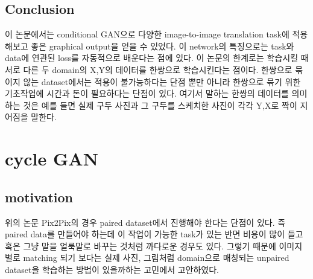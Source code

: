 \documentclass[extendedabs]{bmvc2k}
\begin{document}
 \subsection{Conclusion}
 \quad 이 논문에서는 conditional GAN으로 다양한 image-to-image translation task에 적용해보고 좋은 graphical output을 얻을 수 있었다.
 이 network의 특징으로는 task와 data에 연관된 loss를 자동적으로 배운다는 점에 있다. 이 논문의 한계로는 학습시킬 때 서로 다른 두 domain의 X,Y의 데이터를 한쌍으로 학습시킨다는 점이다.
 한쌍으로 묶이지 않는 dataset에서는 적용이 불가능하다는 단점 뿐만 아니라 한쌍으로 묶기 위한 기초작업에 시간과 돈이 필요하다는 단점이 있다. 
 여기서 말하는 한쌍의 데이터를 의미하는 것은 예를 들면 실제 구두 사진과 그 구두를 스케치한 사진이 각각 Y,X로 짝이 지어짐을 말한다. 

\section{cycle GAN\cite{zhu2017unpaired}}
 \subsection{motivation}
 \quad 위의 논문 Pix2Pix의 경우 paired dataset에서 진행해야 한다는 단점이 있다. 즉 paired data를 만들어야 하는데 이 작업이 가능한 task가 있는 반면
 비용이 많이 들고 혹은 그냥 말을 얼룩말로 바꾸는 것처럼 까다로운 경우도 있다. 그렇기 때문에 이미지 별로 matching 되기 보다는 실제 사진, 
 그림처럼 domain으로 매칭되는 unpaired dataset을 학습하는 방법이 있을까하는 고민에서 고안하였다.
 
\end{document}
